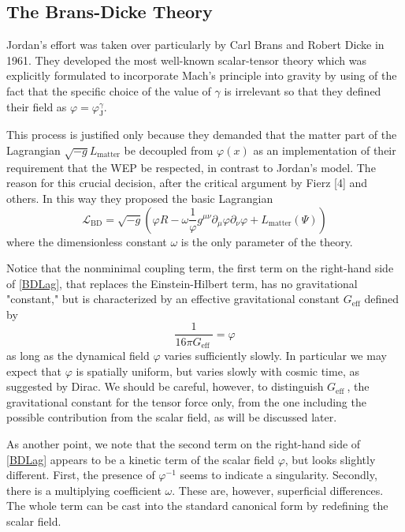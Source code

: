 \documentclass[12pt]{article}
\begin{document}
\subsection{The Brans-Dicke Theory}

Jordan’s effort was taken over particularly by Carl Brans and Robert Dicke in 1961. 
They developed the most well-known scalar-tensor theory which was explicitly formulated to incorporate Mach’s principle into gravity by using of the fact that the specific choice of the value of $\gamma$ is irrelevant so that they defined their field as $\varphi=\varphi_{\mathrm{J}}^{\gamma}$.

This process is justified only because they demanded that the matter part of the Lagrangian $\sqrt{-g} L_{\text {matter}}$ be decoupled from $\varphi(x)$ as an implementation of their requirement that the WEP be respected, in contrast to Jordan's model. 
The reason for this crucial decision, after the critical argument by Fierz [4] and others. 
In this way they proposed the basic Lagrangian
\begin{equation} \label{BDLag}
\mathcal{L}_{\mathrm{BD}}=\sqrt{-g}\left(\varphi R-\omega \frac{1}{\varphi} g^{\mu \nu} \partial_{\mu} \varphi \partial_{\nu} \varphi+L_{\text {matter}}(\Psi)\right) 
\end{equation}
where the dimensionless constant $\omega$ is the only parameter of the theory.

Notice that the nonminimal coupling term, the first term on the right-hand side of \eqref{BDLag}, that replaces the Einstein-Hilbert term, has no gravitational "constant," but is characterized by an effective gravitational constant $G_{\text {eff}}$ defined by
\begin{equation}
\frac{1}{16 \pi G_{\text {eff }}}=\varphi 
\end{equation}
as long as the dynamical field $\varphi$ varies sufficiently slowly.
In particular we may expect that $\varphi$ is spatially uniform, but varies slowly with cosmic time, as suggested by Dirac. 
We should be careful, however, to distinguish $G_{\text {eff }}$, the gravitational constant for the tensor force only, from the one including the possible contribution from the scalar field, as will be discussed later.  

As another point, we note that the second term on the right-hand side of \eqref{BDLag} appears to be a kinetic term of the scalar field $\varphi$, but looks slightly different. 
First, the presence of $\varphi^{-1}$ seems to indicate a singularity. 
Secondly, there is a multiplying coefficient $\omega$. These are, however, superficial differences. 
The whole term can be cast into the standard canonical form by redefining the scalar field.
\end{document}
